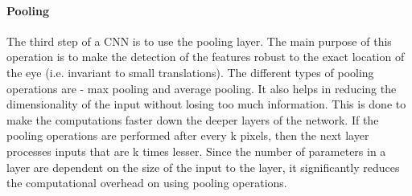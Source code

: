 \paragraph{Pooling}
The third step of a \ac{CNN} is to use the pooling layer. The main purpose of this operation is to make the detection of the features robust to the exact location of the eye (i.e. invariant to small translations). The different types of pooling operations are - max pooling and average pooling. It also helps in reducing the dimensionality of the input without losing too much information. This is done to make the computations faster down the deeper layers of the network. If the pooling operations are performed after every k pixels, then the next layer processes inputs that are k times lesser. Since the number of parameters in a layer are dependent on the size of the input to the layer, it significantly reduces the computational overhead on using pooling operations.

